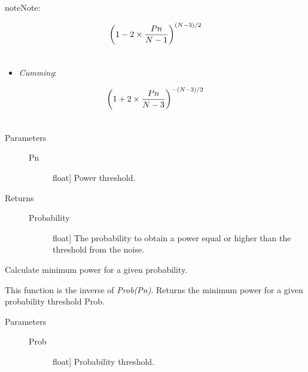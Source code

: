 \documentclass[letterpaper,10pt,english]{sphinxmanual}
\begin{document}
\begin{fulllineitems}
\begin{fulllineitems}
\begin{notice}{note}{Note:}
\begin{itemize}
\end{itemize}
\begin{gather}
\begin{split}\left(1 - 2 \times \frac{Pn}{N-1} \right)^{(N-3)/2}\end{split}\notag\\\begin{split}\end{split}\notag
\end{gather}\begin{itemize}
\item {} 
\emph{Cumming}:

\end{itemize}
\begin{gather}
\begin{split}\left(1+2\times \frac{Pn}{N-3}\right)^{-(N-3)/2}\end{split}\notag\\\begin{split}\end{split}\notag
\end{gather}\end{notice}
\begin{description}
\item[{Parameters}] \leavevmode\begin{description}
\item[{Pn}] \leavevmode{[}float{]}
Power threshold.

\end{description}

\item[{Returns}] \leavevmode\begin{description}
\item[{Probability}] \leavevmode{[}float{]}
The probability to obtain a power equal or
higher than the threshold from the noise.

\end{description}

\end{description}

\end{fulllineitems}


\begin{fulllineitems}
\label{api:OPEN.periodograms.gls.probInv}
Calculate minimum power for a given probability.

This function is the inverse of \emph{Prob(Pn)}.
Returns the minimum power for a given probability threshold Prob.
\begin{description}
\item[{Parameters}] \leavevmode\begin{description}
\item[{Prob}] \leavevmode{[}float{]}
Probability threshold.


\end{description}
\end{description}
\end{fulllineitems}
\end{fulllineitems}
\end{document}
